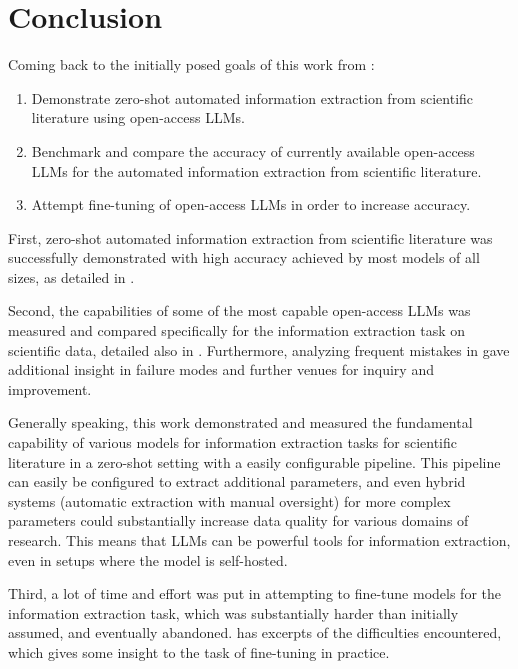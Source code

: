 \chapter{Conclusion}\label{chap:conclusion}


Coming back to the initially posed goals of this work from :

\begin{enumerate}
    \item Demonstrate zero-shot automated information extraction from scientific literature using open-access \glspl{LLM}.
    \item Benchmark and compare the accuracy of currently available open-access \glspl{LLM} for the automated information extraction from scientific literature.
    \item Attempt fine-tuning of open-access \glspl{LLM} in order to increase accuracy.
\end{enumerate}

First, zero-shot automated information extraction from scientific literature was successfully demonstrated with high accuracy achieved by most models of all sizes, as detailed in .

Second, the capabilities of some of the most capable open-access \glspl{LLM} was measured and compared specifically for the information extraction task on scientific data, detailed also in .
Furthermore, analyzing frequent mistakes in  gave additional insight in failure modes and further venues for inquiry and improvement.

Generally speaking, this work demonstrated and measured the fundamental capability of various models for information extraction tasks for scientific literature in a zero-shot setting with a easily configurable pipeline.
This pipeline can easily be configured to extract additional parameters, and even hybrid systems (automatic extraction with manual oversight) for more complex parameters could substantially increase data quality for various domains of research.
This means that \glspl{LLM} can be powerful tools for information extraction, even in setups where the model is self-hosted.

Third, a lot of time and effort was put in attempting to fine-tune models for the information extraction task, which was substantially harder than initially assumed, and eventually abandoned.
 has excerpts of the difficulties encountered, which gives some insight to the task of fine-tuning in practice.










